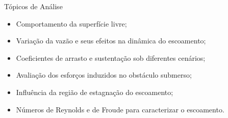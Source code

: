 \begin{frame}{Tópicos de Análise}
    \begin{itemize}
        \large
        \item Comportamento da superfície livre;
        \item Variação da vazão e seus efeitos na dinâmica do escoamento;
        \item Coeficientes de arrasto e sustentação sob diferentes cenários;
        \item Avaliação dos esforços induzidos no obstáculo submerso;
        \item Influência da região de estagnação do escoamento;
        \item Números de Reynolds e de Froude para caracterizar o escoamento.
    \end{itemize}
\end{frame}
